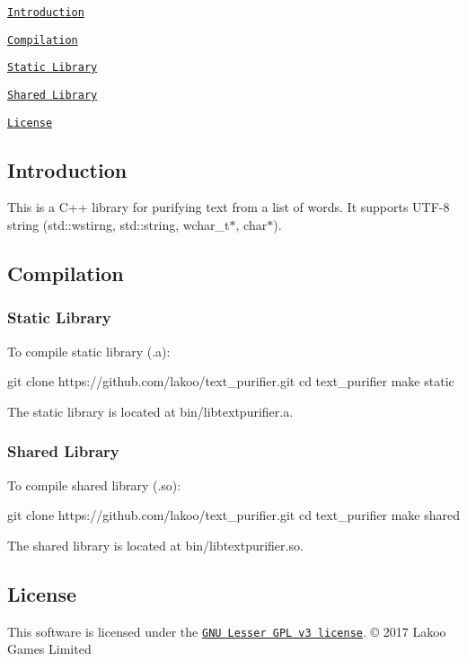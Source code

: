 
\begin{DoxyItemize}
\item \href{#introduction}{\tt Introduction}
\item \href{#compilation}{\tt Compilation}
\begin{DoxyItemize}
\item \href{#static-library}{\tt Static Library}
\item \href{#shared-library}{\tt Shared Library}
\end{DoxyItemize}
\item \href{#license}{\tt License}
\end{DoxyItemize}

\subsection*{Introduction}

This is a C++ library for purifying text from a list of words. It supports U\+T\+F-\/8 string (std\+::wstirng, std\+::string, wchar\+\_\+t$\ast$, char$\ast$).

\subsection*{Compilation}

\subsubsection*{Static Library}

To compile static library (.a)\+: 
\begin{DoxyCode}
git clone https://github.com/lakoo/text\_purifier.git
cd text\_purifier
make static
\end{DoxyCode}


The static library is located at {\ttfamily bin/libtextpurifier.\+a}.

\subsubsection*{Shared Library}

To compile shared library (.so)\+: 
\begin{DoxyCode}
git clone https://github.com/lakoo/text\_purifier.git
cd text\_purifier
make shared
\end{DoxyCode}


The shared library is located at {\ttfamily bin/libtextpurifier.\+so}.

\subsection*{License}

This software is licensed under the \href{https://www.gnu.org/copyleft/lgpl.html}{\tt G\+NU Lesser G\+PL v3 license}. © 2017 Lakoo Games Limited 